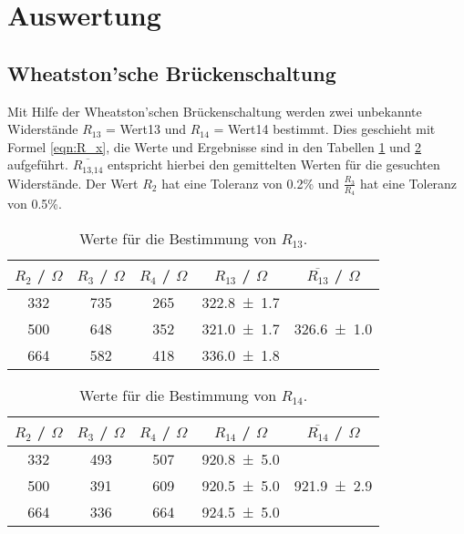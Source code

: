 \section{Auswertung}
\label{sec:Auswertung}

\subsection{Wheatston'sche Brückenschaltung}
Mit Hilfe der Wheatston'schen Brückenschaltung werden zwei unbekannte Widerstände $R_{13}$ = Wert13 und $R_{14}$ = Wert14 bestimmt. Dies geschieht mit Formel \ref{eqn:R_x}, die Werte und Ergebnisse sind in den Tabellen \ref{tab:Wheat1} und \ref{tab:Wheat2} aufgeführt. $\overline{R_\text{13,14}}$ entspricht hierbei den gemittelten Werten für die gesuchten Widerstände. Der Wert $R_2$ hat eine Toleranz von 0.2\% und $\frac{R_3}{R_4}$ hat eine Toleranz von 0.5\%.

\begin{table}[H] %
  \centering
  \begin{tabular}{c c c c c}
    \toprule
    $R_2$ / $\Omega$ & $R_3$ / $\Omega$ & $R_4$ / $\Omega$ & $R_{13}$ / $\Omega$ & $\overline{R_{13}}$ / $\Omega$ \\
    \midrule
    332 & 735 & 265 & \num{322.8 +- 1.7} &  \\
    500 & 648 & 352 & \num{321.0 +- 1.7} &  \num{326.6 +- 1.0}\\
    664 & 582 & 418 & \num{336.0 +- 1.8} &  \\
  \end{tabular}
  \caption{Werte für die Bestimmung von $R_{13}$.}
  \label{tab:Wheat1}
\end{table}

\begin{table}[H] %
  \centering
  \begin{tabular}{c c c c c}
    \toprule
    $R_2$ / $\Omega$ & $R_3$ / $\Omega$ & $R_4$ / $\Omega$ & $R_{14}$ / $\Omega$ & $\overline{R_{14}}$ / $\Omega$ \\
    \midrule
    332 & 493 & 507 & \num{920.8 +- 5.0} &  \\
    500 & 391 & 609 & \num{920.5 +- 5.0} &  \num{921.9 +- 2.9}\\
    664 & 336 & 664 & \num{924.5 +- 5.0} &  \\
  \end{tabular}
  \caption{Werte für die Bestimmung von $R_{14}$.}
  \label{tab:Wheat2}
\end{table}

